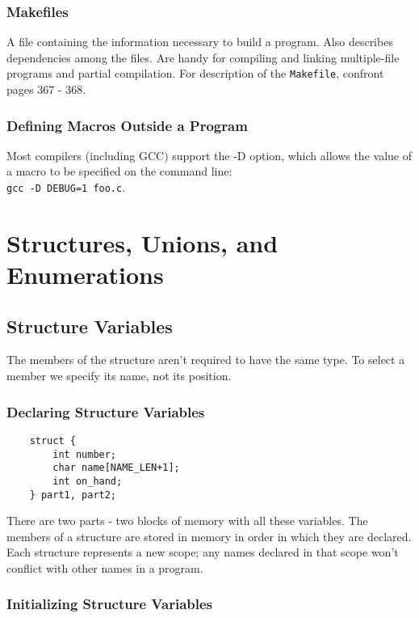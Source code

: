 \documentclass[openany]{book}
\begin{document}
    \subsection*{Makefiles}
    A file containing the information necessary to build a program. Also describes dependencies among the files. Are handy for compiling and linking multiple-file programs and partial compilation. For description of the \texttt{Makefile}, confront pages 367 - 368.

    \subsection*{Defining Macros Outside a Program}
    Most compilers (including GCC) support the -D option, which allows the value of a macro to be specified on the command line: \\
    \texttt{gcc -D DEBUG=1 foo.c}.



    \chapter{Structures, Unions, and Enumerations}

    \section{Structure Variables}
    The members of the structure aren't required to have the same type. To select a member we specify its name, not its position.
    
    \subsection*{Declaring Structure Variables}

    \begin{lstlisting}
    struct {
        int number;
        char name[NAME_LEN+1];
        int on_hand;
    } part1, part2;
    \end{lstlisting}

    There are two parts - two blocks of memory with all these variables. The members of a structure are stored in memory in order in which they are declared. Each structure represents a new scope; any names declared in that scope won't conflict with other names in a program. 

    \subsection*{Initializing Structure Variables}
\end{document}

